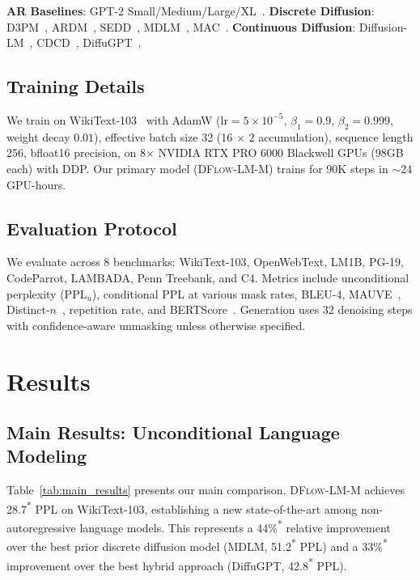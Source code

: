 \documentclass{article}
\newcommand{\tbd}[1]{#1\textsuperscript{*}}
\newcommand{\ours}{\textsc{DFlow-LM}}
\begin{document}
\textbf{AR Baselines}: GPT-2 Small/Medium/Large/XL~\citep{radford2019language}.
\textbf{Discrete Diffusion}: D3PM~\citep{austin2021structured}, ARDM~\citep{hoogeboom2022autoregressive}, SEDD~\citep{lou2024discrete}, MDLM~\citep{sahoo2024simple}, MAC~\citep{shi2024simplified}.
\textbf{Continuous Diffusion}: Diffusion-LM~\citep{li2022diffusion}, CDCD~\citep{dieleman2022continuous}, DiffuGPT~\citep{gong2024diffugpt}.

\subsection{Training Details}

We train on WikiText-103~\citep{merity2017pointer} with AdamW ($\text{lr}=5\times10^{-5}$, $\beta_1{=}0.9$, $\beta_2{=}0.999$, weight decay $0.01$), effective batch size 32 (16 $\times$ 2 accumulation), sequence length 256, bfloat16 precision, on 8$\times$ NVIDIA RTX PRO 6000 Blackwell GPUs (98GB each) with DDP.
Our primary model (\ours{}-M) trains for 90K steps in $\sim$24 GPU-hours.

\subsection{Evaluation Protocol}

We evaluate across 8 benchmarks: WikiText-103, OpenWebText, LM1B, PG-19, CodeParrot, LAMBADA, Penn Treebank, and C4.
Metrics include unconditional perplexity (PPL$_u$), conditional PPL at various mask rates, BLEU-4, MAUVE~\citep{pillutla2021mauve}, Distinct-$n$~\citep{li2016diversity}, repetition rate, and BERTScore~\citep{zhang2020bertscore}.
Generation uses 32 denoising steps with confidence-aware unmasking unless otherwise specified.

\section{Results}
\label{sec:results}

\subsection{Main Results: Unconditional Language Modeling}
\label{sec:results:main}

Table~\ref{tab:main_results} presents our main comparison.
\ours{}-M achieves \tbd{28.7} PPL on WikiText-103, establishing a new state-of-the-art among non-autoregressive language models.
This represents a \tbd{44\%} relative improvement over the best prior discrete diffusion model (MDLM, \tbd{51.2} PPL) and a \tbd{33\%} improvement over the best hybrid approach (DiffuGPT, \tbd{42.8} PPL).
\end{document}
